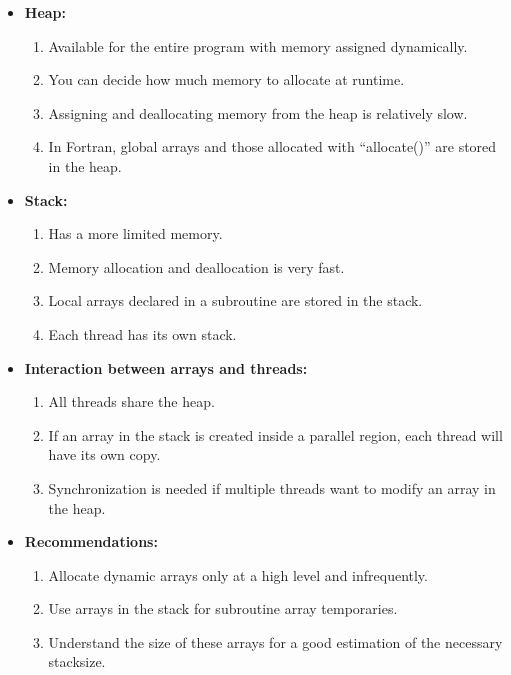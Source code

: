 \begin{itemize}
    \item \textbf{Heap:}
    \begin{enumerate}
        \item Available for the entire program with memory assigned dynamically.
        \item You can decide how much memory to allocate at runtime.
        \item Assigning and deallocating memory from the heap is relatively slow.
        \item In Fortran, global arrays and those allocated with ``allocate()'' are stored in the heap.
    \end{enumerate}

    \item \textbf{Stack:}
    \begin{enumerate}
        \item Has a more limited memory.
        \item Memory allocation and deallocation is very fast.
        \item Local arrays declared in a subroutine are stored in the stack.
        \item Each thread has its own stack.
    \end{enumerate}

    \item \textbf{Interaction between arrays and threads:}
    \begin{enumerate}
        \item All threads share the heap.
        \item If an array in the stack is created inside a parallel region, each thread will have its own copy.
        \item Synchronization is needed if multiple threads want to modify an array in the heap.
    \end{enumerate}

    \item \textbf{Recommendations:}
    \begin{enumerate}
        \item Allocate dynamic arrays only at a high level and infrequently.
        \item Use arrays in the stack for subroutine array temporaries.
        \item Understand the size of these arrays for a good estimation of the necessary stacksize.
    \end{enumerate}
\end{itemize}